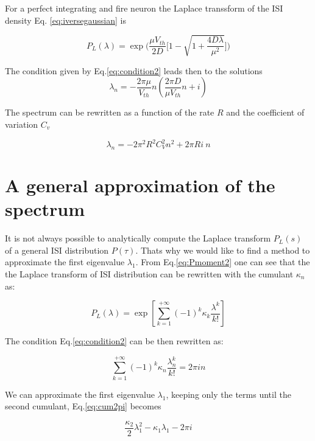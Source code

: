 \documentclass[12pt,twoside]{report}
\begin{document}
For a perfect integrating and  fire neuron the Laplace transsform of the ISI density Eq. \eqref{eq:iversegaussian} is

\begin{equation}
P_L(\lambda)=\exp\big(\frac{\mu V_{th}}{2D}\big[1-\sqrt{1+\frac{4D\lambda}{\mu^2}}\big]\big)
\end{equation}



The condition given by Eq.\eqref{eq:condition2} leads then to the solutions
\begin{equation}
\lambda_n=- \frac{2\pi\mu}{V_{th}}n( \frac{2\pi D}{\mu V_{th}}n + i)
\end{equation}

The spectrum can be rewritten as a function of the rate $R$ and the coefficient of variation $C_v$

\begin{equation}
\lambda_n=- 2\pi^2R^2C_V^2n^2+2\pi R i\:n
\end{equation}

\section{A general approximation of the spectrum}

It is not always possible to analytically compute the Laplace transform $P_L(s)$ of a general ISI distribution $P(\tau)$. Thats why we would like to find a method to approximate the first eigenvalue $\lambda_1$. From Eq.\eqref{eq:Pmoment2} one can see that the the Laplace transform of ISI distribution can be rewritten with the cumulant $\kappa_n$ as:

\begin{equation}
\label{eq:PLcum}
P_L(\lambda)=\exp\left[ \sum_{k=1}^{+\infty}(-1)^k\kappa_k \frac{\lambda^k}{k!}\right]
\end{equation}

The condition Eq.\eqref{eq:condition2} can be then rewritten as:

\begin{equation}
\label{eq:cum2pi}
\sum_{k=1}^{+\infty}(-1)^k\kappa_n \frac{\lambda_n^k}{k!}=2 \pi i n
\end{equation}

We can approximate the first eigenvalue $\lambda_1$, keeping only the terms until the second cumulant, Eq.\eqref{eq:cum2pi} becomes

\begin{equation}
\label{eq:cumaprox}
\frac{\kappa_2}{2}\lambda_1^2-\kappa_1\lambda_1 -2\pi i
\end{equation}
\end{document}
